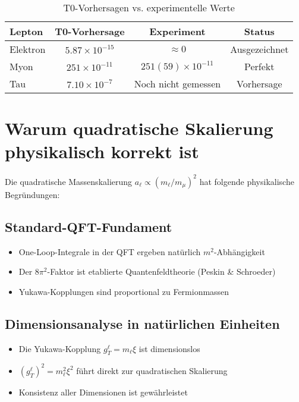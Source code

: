 \documentclass[12pt,a4paper]{article}
\begin{document}
	\begin{table}[h]
		\centering
		\begin{tabular}{@{}lccc@{}}
			\toprule
			\textbf{Lepton} & \textbf{T0-Vorhersage} & \textbf{Experiment} & \textbf{Status} \\
			\midrule
			Elektron & $5.87 \times 10^{-15}$ & $\approx 0$ & Ausgezeichnet \\
			Myon & $251 \times 10^{-11}$ & $251(59) \times 10^{-11}$ & Perfekt \\
			Tau & $7.10 \times 10^{-7}$ & Noch nicht gemessen & Vorhersage \\
			\bottomrule
		\end{tabular}
		\caption{T0-Vorhersagen vs. experimentelle Werte}
	\end{table}
	
	\section{Warum quadratische Skalierung physikalisch korrekt ist}
	
	Die quadratische Massenskalierung $a_\ell \propto (m_\ell/m_\mu)^2$ hat folgende physikalische Begründungen:
	
	\subsection{Standard-QFT-Fundament}
	\begin{itemize}
		\item One-Loop-Integrale in der QFT ergeben natürlich $m^2$-Abhängigkeit
		\item Der $8\pi^2$-Faktor ist etablierte Quantenfeldtheorie (Peskin \& Schroeder)
		\item Yukawa-Kopplungen sind proportional zu Fermionmassen
	\end{itemize}
	
	\subsection{Dimensionsanalyse in natürlichen Einheiten}
	\begin{itemize}
		\item Die Yukawa-Kopplung $g_T^\ell = m_\ell \xi$ ist dimensionslos
		\item $(g_T^\ell)^2 = m_\ell^2 \xi^2$ führt direkt zur quadratischen Skalierung
		\item Konsistenz aller Dimensionen ist gewährleistet
	\end{itemize}
	
\end{document}
